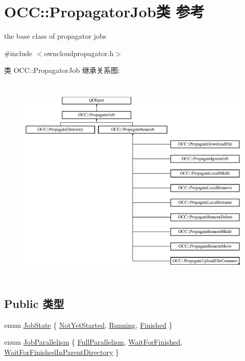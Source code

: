 \hypertarget{class_o_c_c_1_1_propagator_job}{}\section{O\+CC\+:\+:Propagator\+Job类 参考}
\label{class_o_c_c_1_1_propagator_job}


the base class of propagator jobs  




{\ttfamily \#include $<$owncloudpropagator.\+h$>$}

类 O\+CC\+:\+:Propagator\+Job 继承关系图\+:\begin{figure}[H]
\begin{center}
\leavevmode
\includegraphics[height=10.181818cm]{class_o_c_c_1_1_propagator_job}
\end{center}
\end{figure}
\subsection*{Public 类型}
\begin{DoxyCompactItemize}
\item 
enum \hyperlink{class_o_c_c_1_1_propagator_job_afe241af4af083af8c00b0c88c921fa32}{Job\+State} \{ \hyperlink{class_o_c_c_1_1_propagator_job_afe241af4af083af8c00b0c88c921fa32a0d4fd4f8ff5ae07441a0c0057ee99b1a}{Not\+Yet\+Started}, 
\hyperlink{class_o_c_c_1_1_propagator_job_afe241af4af083af8c00b0c88c921fa32a094c0f80cf1a02e513afa0e06fdfaedd}{Running}, 
\hyperlink{class_o_c_c_1_1_propagator_job_afe241af4af083af8c00b0c88c921fa32a307154fbbcf9e51090fc11dba98b2217}{Finished}
 \}
\item 
enum \hyperlink{class_o_c_c_1_1_propagator_job_a2527eb0e2b598fc260a2d6449689c156}{Job\+Parallelism} \{ \hyperlink{class_o_c_c_1_1_propagator_job_a2527eb0e2b598fc260a2d6449689c156a6bc740c15c0662e4bc4f5a9c0764afd0}{Full\+Parallelism}, 
\hyperlink{class_o_c_c_1_1_propagator_job_a2527eb0e2b598fc260a2d6449689c156ae8c082ed729153442fea29ebc1f14215}{Wait\+For\+Finished}, 
\hyperlink{class_o_c_c_1_1_propagator_job_a2527eb0e2b598fc260a2d6449689c156af1af1d03a808923db8aa3c25f91145fd}{Wait\+For\+Finished\+In\+Parent\+Directory}
 \}
\end{DoxyCompactItemize}
